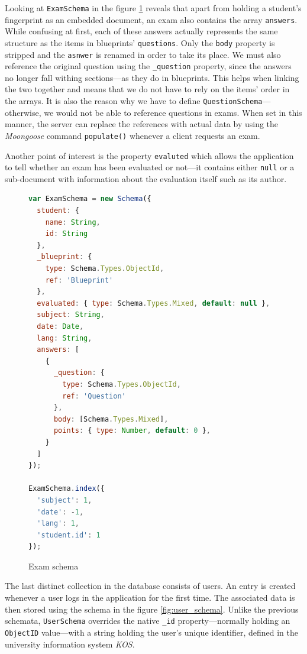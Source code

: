 \documentclass[thesis=M,english,hidelinks]{FITthesis}[2012/10/20]
\newcommand{\code}{\texttt}
\begin{document}
Looking at \code{ExamSchema} in the figure \ref{fig:exam_schema} reveals that apart from holding a student's fingerprint as an embedded document, an exam also contains the array \code{answers}. While confusing at first, each of these answers actually represents the same structure as the items in blueprints' \code{questions}. Only the \code{body} property is stripped and the \code{asnwer} is renamed in order to take its place. We must also reference the original question using the \code{\_question} property, since the answers no longer fall withing sections---as they do in blueprints. This helps when linking the two together and means that we do not have to rely on the items' order in the arrays. It is also the reason why we have to define \code{QuestionSchema}---otherwise, we would not be able to reference questions in exams. When set in this manner, the server can replace the references with actual data by using the \textit{Moongoose} command \code{populate()} whenever a client requests an exam.

Another point of interest is the property \code{evaluted} which allows the application to tell whether an exam has been evaluated or not---it contains either \code{null} or a sub-document with information about the evaluation itself such as its author.

\begin{figure}
  \begin{lstlisting}[language=JavaScript]
var ExamSchema = new Schema({
  student: {
    name: String,
    id: String
  },
  _blueprint: {
    type: Schema.Types.ObjectId,
    ref: 'Blueprint'
  },
  evaluated: { type: Schema.Types.Mixed, default: null },
  subject: String,
  date: Date,
  lang: String,
  answers: [
    {
      _question: {
        type: Schema.Types.ObjectId,
        ref: 'Question'
      },
      body: [Schema.Types.Mixed],
      points: { type: Number, default: 0 },
    }
  ]
});

ExamSchema.index({
  'subject': 1,
  'date': -1,
  'lang': 1,
  'student.id': 1
});
  \end{lstlisting}
  \caption{Exam schema}
  \label{fig:exam_schema}
\end{figure}

The last distinct collection in the database consists of users. An entry is created whenever a user logs in the application for the first time. The associated data is then stored using the schema in the figure \ref{fig:user_schema}. Unlike the previous schemata, \code{UserSchema} overrides the native \code{\_id} property---normally holding an \code{ObjectID} value---with a string holding the user's unique identifier, defined in the university information system \textit{KOS}.
\end{document}
